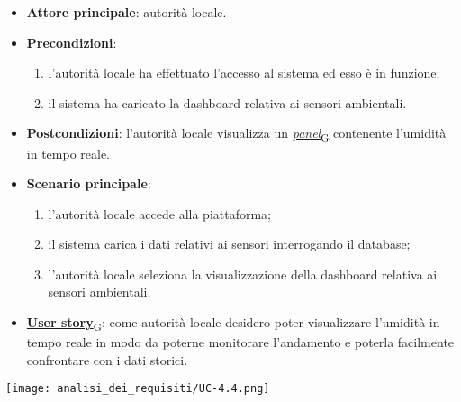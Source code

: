 \begin{itemize}
	\item \textbf{Attore principale}: autorità locale.
	\item \textbf{Precondizioni}:
	      \begin{enumerate}
		      \item l'autorità locale ha effettuato l'accesso al sistema ed esso è in funzione;
		      \item il sistema ha caricato la dashboard relativa ai sensori ambientali.
	      \end{enumerate}
	\item \textbf{Postcondizioni}: l'autorità locale visualizza un \href{https://7last.github.io/docs/pb/documentazione-interna/glossario\#panel}{\textit{panel}\textsubscript{G}} contenente l'umidità in tempo reale.
	\item \textbf{Scenario principale}:
	      \begin{enumerate}
		      \item l'autorità locale accede alla piattaforma;
		      \item il sistema carica i dati relativi ai sensori interrogando il database;
		      \item l'autorità locale seleziona la visualizzazione della dashboard relativa ai sensori ambientali.
	      \end{enumerate}
	\item \href{https://7last.github.io/docs/pb/documentazione-interna/glossario\#user-story}{\textbf{User story}\textsubscript{G}}:
	      come autorità locale desidero poter visualizzare l'umidità in tempo reale in modo da poterne monitorare l'andamento
	      e poterla facilmente confrontare con i dati storici.
\end{itemize}
\begin{center}
	\texttt{[image: analisi\_dei\_requisiti/UC-4.4.png]}
\end{center}


